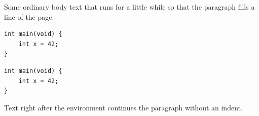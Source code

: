 \documentclass{article}
\begin{document}
Some ordinary body text that runs for a little while so that the paragraph fills a line of the page.
\begin{lstlisting}[basicstyle=\ttfamily,columns={[l]fixed}]
int main(void) {
    int x = 42;
}
\end{lstlisting}
\begin{lstlisting}[basicstyle=\ttfamily,columns={[r]fixed}]
int main(void) {
    int x = 42;
}
\end{lstlisting}
Text right after the environment continues the paragraph without an indent.
\end{document}
